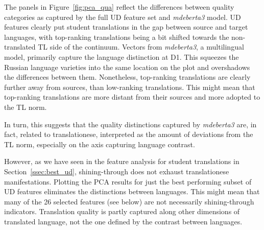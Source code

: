 The panels in Figure~\ref{fig:pca_qua} reflect the differences between quality categories as captured by the full UD feature set and \textit{mdeberta3} model. UD features clearly put student translations in the gap between source and target languages, with top-ranking translations being a bit shifted towards the non-translated TL side of the continuum. 
Vectors from \textit{mdeberta3}, a multilingual model, primarily capture the language distinction at D1. This squeezes the Russian language varieties into the same location on the plot and overshadows the differences between them. Nonetheless, top-ranking translations are clearly further away from sources, than low-ranking translations. This might mean that top-ranking translations are more distant from their sources and more adopted to the TL norm. 

In turn, this suggests that the quality distinctions captured by \textit{mdeberta3} are, in fact, related to translationese, interpreted as the amount of deviations from the TL norm, especially on the axis capturing language contrast.

However, as we have seen in the feature analysis for student translations in Section~\ref{ssec:best_ud}, shining-through does not exhaust translationese manifestations. Plotting the PCA results for just the best performing subset of UD features eliminates the distinctions between languages. This might mean that many of the 26 selected features (see below) are not necessarily shining-through indicators. Translation quality is partly captured along other dimensions of translated language, not the one defined by the contrast between languages. 

